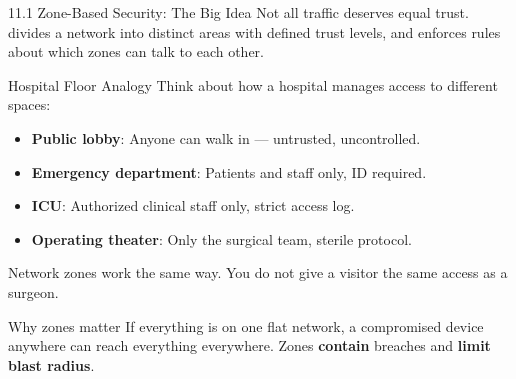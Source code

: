 \documentclass[aspectratio=169]{beamer}  %
\begin{document}
\begin{frame}{11.1 Zone-Based Security: The Big Idea}
    \footnotesize
    Not all traffic deserves equal trust.  divides a network into distinct areas with defined trust levels, and enforces rules about which zones can talk to each other.

    \vspace{0.4em}
    \begin{exampleblock}{Hospital Floor Analogy}
        \footnotesize
        Think about how a hospital manages access to different spaces:
        \begin{itemize}
            \item \textbf{Public lobby}: Anyone can walk in --- untrusted, uncontrolled.
            \item \textbf{Emergency department}: Patients and staff only, ID required.
            \item \textbf{ICU}: Authorized clinical staff only, strict access log.
            \item \textbf{Operating theater}: Only the surgical team, sterile protocol.
        \end{itemize}
        Network zones work the same way. You do not give a visitor the same access as a surgeon.
    \end{exampleblock}

    \begin{block}{Why zones matter}
        \footnotesize
        If everything is on one flat network, a compromised device anywhere can reach everything everywhere. Zones \textbf{contain} breaches and \textbf{limit blast radius}.
    \end{block}
\end{frame}
\end{document}
